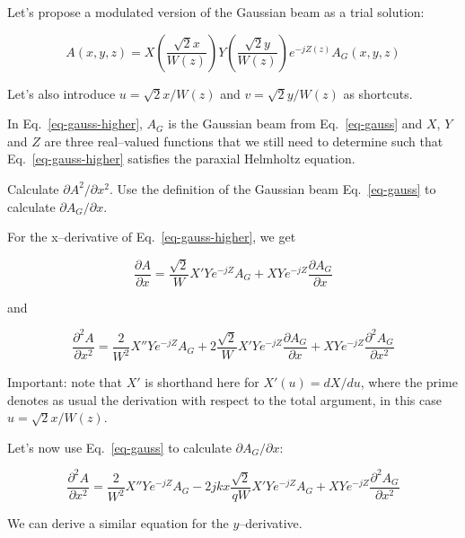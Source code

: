 Let's propose a modulated version of the Gaussian beam as a trial solution:

\begin{equation}
A(x,y,z) = X\left({\frac{\sqrt{2}x}{W(z)}}\right) Y\left({\frac{\sqrt{2}y}{W(z)}}\right) e^{-jZ(z)} A_G(x,y,z) \label{eq-gauss-higher}
\end{equation} 

Let's also introduce $u = \sqrt{2} x / W(z)$ and  $v = \sqrt{2} y / W(z)$ as shortcuts. 

In Eq.~\ref{eq-gauss-higher}, $A_G$ is the Gaussian beam from Eq.~\ref{eq-gauss} and $X$, $Y$ and $Z$ are three real--valued functions that we still need to determine such that Eq.~\ref{eq-gauss-higher} satisfies the paraxial Helmholtz equation.


\begin{cue}
Calculate $\partial A^2 / \partial x^2$. Use the definition of the Gaussian beam Eq.~\ref{eq-gauss} to calculate $\partial A_G / \partial x$. 
\end{cue}
  
For the x--derivative of Eq.~\ref{eq-gauss-higher}, we get

\begin{equation}
\frac{\partial A}{\partial x} = \frac{\sqrt{2}}{W}X'Ye^{-jZ} A_G + XYe^{-jZ} \frac{\partial A_G}{\partial x} 
\end{equation} 

and

\begin{equation}
\frac{\partial^2 A}{\partial x^2} = \frac{2}{W^2}X''Ye^{-jZ} A_G  + 2\frac{\sqrt{2}}{W}X'Ye^{-jZ} \frac{\partial A_G}{\partial x}  + XYe^{-jZ} \frac{\partial^2 A_G}{\partial x^2}
\end{equation} 

Important: note that $X'$ is shorthand here for $X'(u)=dX/du$, where the prime denotes as usual the derivation with respect to the total argument, in this case $u=\sqrt{2}x/W(z)$.

Let's now use Eq.~\ref{eq-gauss} to calculate $\partial A_G / \partial x$:

\begin{equation}
\frac{\partial^2 A}{\partial x^2} = \frac{2}{W^2}X''Ye^{-jZ} A_G  - 2j k x \frac{\sqrt{2}}{qW}X'Ye^{-jZ}A_G  + XYe^{-jZ} \frac{\partial^2 A_G}{\partial x^2} \label{eq-hermite-gauss-1}
\end{equation} 

We can derive a similar equation for the $y$--derivative.

